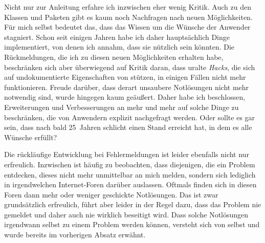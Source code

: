 
Nicht nur zur Anleitung erfahre ich inzwischen eher wenig Kritik. Auch zu den
Klassen und Paketen gibt es kaum noch Nachfragen nach neuen Möglichkeiten. Für
mich selbst bedeutet das, dass das Wissen um die Wünsche der Anwender
stagniert. Schon seit einigen Jahren habe ich daher hauptsächlich Dinge
implementiert, von denen ich annahm, dass sie nützlich sein könnten. Die
Rückmeldungen, die ich zu diesen neuen Möglichkeiten erhalten habe,
beschränken sich aber überwiegend auf Kritik daran, dass uralte \emph{Hacks},
die sich auf undokumentierte Eigenschaften von \KOMAScript{} stützen, in
einigen Fällen nicht mehr funktionieren. Freude darüber, dass derart unsaubere
Notlösungen nicht mehr notwendig sind, wurde hingegen kaum geäußert. Daher
habe ich beschlossen, Erweiterungen und Verbesserungen an \KOMAScript{} mehr
und mehr auf solche Dinge zu beschränken, die von Anwendern explizit
nachgefragt werden. Oder sollte es gar sein, dass \KOMAScript{} nach bald
25~Jahren schlicht einen Stand erreicht hat, in dem es alle Wünsche erfüllt?

Die rückläufige Entwicklung bei Fehlermeldungen ist leider ebenfalls nicht nur
erfreulich. Inzwischen ist häufig zu beobachten, dass diejenigen, die ein
Problem entdecken, dieses nicht mehr unmittelbar an mich melden, sondern sich
lediglich in irgendwelchen Internet-Foren darüber auslassen. Oftmals finden
sich in diesen Foren dann mehr oder weniger geschickte Notlösungen. Das ist
zwar grundsätzlich erfreulich, führt aber leider in der Regel dazu, dass das
Problem nie gemeldet und daher auch nie wirklich beseitigt wird. Dass solche
Notlösungen irgendwann selbst zu einem Problem werden können, versteht sich
von selbst und wurde bereits im vorherigen Absatz erwähnt.


